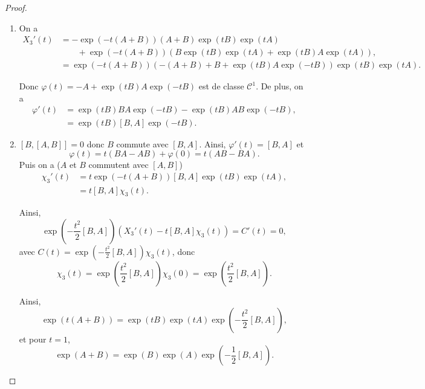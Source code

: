 \documentclass[12pt]{article}
\begin{document}
\begin{proof}
	\phantom{}
	\begin{enumerate}
		\item On a 
		\begin{align}
			X_3'(t)
			&=-\exp(-t(A+B))(A+B)\exp(tB)\exp(tA)\\
			&\qquad+\exp\left(-t(A+B)\right)\left(B\exp(tB)\exp(tA)+\exp(tB)A\exp(tA)\right)\nonumber,\\
			&=\exp(-t(A+B))\left(-(A+B)+B+\exp(tB)A\exp(-tB)\right)\exp(tB)\exp(tA).
		\end{align}

		Donc $\varphi(t)=-A+\exp(tB)A\exp(-tB)$ est de classe $\mathcal{C}^{1}$. De plus, on a 
		\begin{align}
			\varphi'(t)
			&=\exp(tB)BA\exp(-tB)-\exp(tB)AB\exp(-tB),\\
			&=\exp(tB)[B,A]\exp(-tB).
		\end{align}

		\item $[B,[A,B]]=0$ donc $B$ commute avec $[B,A]$. Ainsi, $\varphi'(t)=[B,A]$ et 
		\begin{equation}
			\varphi(t)=t(BA-AB)+\varphi(0)=t(AB-BA).
		\end{equation}
		Puis on a ($A$ et $B$ commutent avec $[A,B]$)
		\begin{align}
			\chi_{3}'(t)
			&=t\exp(-t(A+B))[B,A]\exp(tB)\exp(tA),\\
			&=t[B,A]\chi_3(t).
		\end{align}

		Ainsi,
		\begin{equation}
			\exp\left(-\frac{t^{2}}{2}[B,A]\right)\left(X_3'(t)-t[B,A]\chi_3(t)\right)=C'(t)=0,
		\end{equation}
		avec $C(t)=\exp\left(-\frac{t^{2}}{2}[B,A]\right)\chi_{3}(t)$, donc 
		\begin{equation}
			\chi_3(t)=\exp\left(\frac{t^{2}}{2}[B,A]\right)\chi_3(0)=\exp\left(\frac{t^{2}}{2}[B,A]\right).
		\end{equation}

		Ainsi,
		\begin{equation}
			\exp\left(t(A+B)\right)=\exp(tB)\exp(tA)\exp\left(-\frac{t^{2}}{2}[B,A]\right),
		\end{equation}
		et pour $t=1$,
		\begin{equation}
			\exp(A+B)=\exp(B)\exp(A)\exp\left(-\frac{1}{2}[B,A]\right).
		\end{equation}
	\end{enumerate}
\end{proof}
\end{document}
